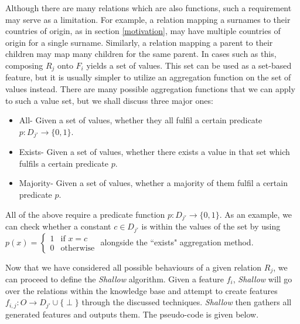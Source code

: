 \documentclass[twoside,11pt]{article}
\theoremstyle{definition}
\begin{document}
Although there are many relations which are also functions, such a requirement may serve as a limitation. For example, a relation mapping a surnames to their countries of origin, as in section \ref{motivation}, may have multiple countries of origin for a single surname. Similarly, a relation mapping a parent to their children may map many children for the same parent.
In cases such as this, composing $R_j$ onto $F_i$ yields a set of values. This set can be used as a set-based feature, but it is usually simpler to utilize an aggregation function on the set of values instead. There are many possible aggregation functions that we can apply to such a value set, but we shall discuss three major ones:
\begin{itemize}
	\item All- Given a set of values, whether they all fulfil a certain predicate $p:D_{j'}\rightarrow\{0,1\}$.
	\item Exists- Given a set of values, whether there exists a value in that set which fulfils a certain predicate $p$.
	\item Majority- Given a set of values, whether a majority of them fulfil a certain predicate $p$.
\end{itemize}
All of the above require a predicate function $p:D_{j'}\rightarrow \{0,1\}$.
As an example, we can check whether a constant $c\in D_{j'}$ is within the values of the set by using $p(x)=\begin{cases}
1 & \mbox{if } x=c\\ 0 & \mbox{otherwise}
\end{cases}$ alongside the ``exists" aggregation method.

Now that we have considered all possible behaviours of a given relation $R_j$, we can proceed to define the \emph{Shallow} algorithm. Given a feature $f_i$, \emph{Shallow} will go over the relations within the knowledge base and attempt to create features $f_{i,j}:O\rightarrow D_{j'}\cup\{\perp\}$ through the discussed techniques. \emph{Shallow} then gathers all generated features and outputs them. The pseudo-code is given below.
\end{document}
